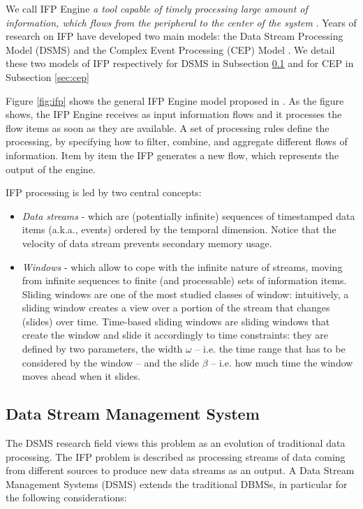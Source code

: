 We call IFP Engine \textit{a tool capable of timely processing large amount of information, which flows from the peripheral to the center of the system} \cite{Cugola:2012:PFI:2187671.2187677}. Years of research on IFP have developed two main models: the Data Stream Processing Model (DSMS) \cite{Babcock:2002:MID:543613.543615} and the Complex Event Processing (CEP) Model \cite{Luckham:2001:PEI:515781}. We detail these two models of IFP respectively for DSMS in Subsection \ref{sec:dsms} and for CEP in Subsection \ref{sec:cep}

Figure \ref{fig:ifp} shows the general IFP Engine model proposed in \cite{Cugola:2012:PFI:2187671.2187677}. As the figure shows, the IFP Engine receives as input information flows and it processes the flow items as soon as they are available. A set of processing rules define the processing, by specifying how to filter, combine, and aggregate different flows of information. Item by item the IFP generates a new flow, which represents the output of the engine.

IFP processing is led by two central concepts:
\begin{itemize}

\item \textit{Data streams} - which are (potentially infinite) sequences of timestamped data items (a.k.a., events) ordered by the temporal dimension. Notice that the velocity of data stream prevents secondary memory usage. 

\item \textit{Windows} - which allow to cope with the infinite nature of streams, moving from infinite sequences to finite (and processable) sets of information items. Sliding windows are one of the most studied classes of window: intuitively, a sliding window creates a view over a portion of the stream that changes (slides) over time. Time-based sliding windows are sliding windows that create the window and slide it accordingly to time constraints: they are defined by two parameters, the width $\omega$	 – i.e. the time range that has to be considered by the window – and the slide $\beta$ – i.e. how much time the window moves ahead when it slides.

\end{itemize}

\subsection{Data Stream Management System}\label{sec:dsms}
The DSMS research field  views this problem as an evolution of traditional data processing. The IFP problem is described as processing streams of data coming from different sources to produce new data streams as an output. A Data Stream Management Systems (DSMS) extends the traditional DBMSs, in particular for the following considerations:

